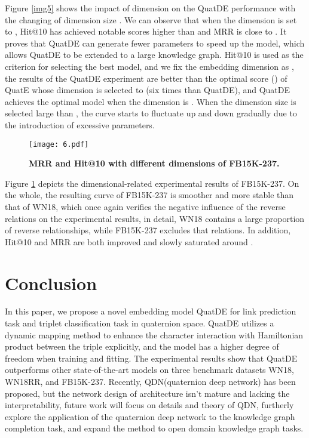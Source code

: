 \documentclass[letterpaper]{article} \usepackage{aaai20}  \usepackage{times}  \usepackage{helvet} \usepackage{courier}  \usepackage[hyphens]{url}  \usepackage{graphicx} \usepackage{lineno,hyperref,amsmath,amssymb}
\begin{document}
Figure \ref{img5} shows the impact of dimension on the QuatDE performance with the changing of dimension size . We can observe that when the dimension is set to , Hit@10 has achieved notable scores higher than  and MRR is close to . It proves that QuatDE can generate fewer parameters to speed up the model, which allows QuatDE to be extended to a large knowledge graph. Hit@10 is used as the criterion for selecting the best model, and we fix the embedding dimension as , the results of the QuatDE experiment are better than the optimal score () of QuatE whose dimension is selected to  (six times than QuatDE), and QuatDE achieves the optimal model when the dimension is . When the dimension size is selected large than , the curve starts to fluctuate up and down gradually due to the introduction of excessive parameters.

\begin{figure}[ht]
\centering
\texttt{[image: 6.pdf]}
\caption{\textbf{MRR and Hit@10 with different dimensions of FB15K-237.}}
\label{img6}
\end{figure}

Figure \ref{img6} depicts the dimensional-related experimental results of FB15K-237. On the whole, the resulting curve of FB15K-237 is smoother and more stable than that of WN18, which once again verifies the negative influence of the reverse relations on the experimental results, in detail, WN18 contains a large proportion of reverse relationships, while FB15K-237 excludes that relations. In addition, Hit@10 and MRR are both improved and slowly saturated around .

\section{Conclusion}

In this paper, we propose a novel embedding model QuatDE for link prediction task and triplet classification task in quaternion space. QuatDE utilizes a dynamic mapping method to enhance the character interaction with Hamiltonian product between the triple explicitly, and the model has a higher degree of freedom when training and fitting. The experimental results show that QuatDE outperforms other state-of-the-art models on three benchmark datasets WN18, WN18RR, and FB15K-237. Recently, QDN(quaternion deep network) has been proposed, but the network design of architecture isn’t mature and lacking the interpretability, future work will focus on details and theory of QDN, furtherly explore the application of the quaternion deep network to the knowledge graph completion task, and expand the method to open domain knowledge graph tasks.




\end{document}
